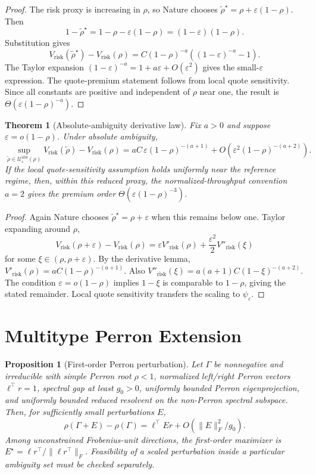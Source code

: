 \documentclass[11pt]{article}
\newtheorem{proposition}[assumption]{Proposition}
\newtheorem{theorem}[assumption]{Theorem}
\newcommand{\eps}{\varepsilon}
\begin{document}
\begin{proof}
The risk proxy is increasing in $\rho$, so Nature chooses
$\tilde\rho^\star=\rho+\eps(1-\rho)$. Then
\[
1-\tilde\rho^\star = 1-\rho-\eps(1-\rho)=(1-\eps)(1-\rho).
\]
Substitution gives
\[
V_{\mathrm{risk}}(\tilde\rho^\star)-V_{\mathrm{risk}}(\rho)
=C(1-\rho)^{-a}\left((1-\eps)^{-a}-1\right).
\]
The Taylor expansion
$(1-\eps)^{-a}=1+a\eps+O(\eps^2)$ gives the small-$\eps$ expression. The
quote-premium statement follows from local quote sensitivity. Since all
constants are positive and independent of $\rho$ near one, the result is
$\Theta(\eps(1-\rho)^{-a})$.
\end{proof}

\begin{theorem}[Absolute-ambiguity derivative law]
Fix $a>0$ and suppose $\eps=o(1-\rho)$. Under absolute ambiguity,
\[
\sup_{\tilde\rho\in\mathcal U^{\mathrm{abs}}_\eps(\rho)}
V_{\mathrm{risk}}(\tilde\rho)-V_{\mathrm{risk}}(\rho)
=aC\,\eps(1-\rho)^{-(a+1)}
+O(\eps^2(1-\rho)^{-(a+2)}).
\]
If the local quote-sensitivity assumption holds uniformly near the reference
regime, then, within this reduced proxy, the normalized-throughput convention
$a=2$ gives the premium order
$\Theta(\eps(1-\rho)^{-3})$.
\end{theorem}

\begin{proof}
Again Nature chooses $\tilde\rho^\star=\rho+\eps$ when this remains below one.
Taylor expanding around $\rho$,
\[
V_{\mathrm{risk}}(\rho+\eps)-V_{\mathrm{risk}}(\rho)
=\eps V'_{\mathrm{risk}}(\rho)
+\frac{\eps^2}{2}V''_{\mathrm{risk}}(\xi)
\]
for some $\xi\in(\rho,\rho+\eps)$. By the derivative lemma,
$V'_{\mathrm{risk}}(\rho)=aC(1-\rho)^{-(a+1)}$. Also
$V''_{\mathrm{risk}}(\xi)=a(a+1)C(1-\xi)^{-(a+2)}$. The condition
$\eps=o(1-\rho)$ implies $1-\xi$ is comparable to $1-\rho$, giving the stated
remainder. Local quote sensitivity transfers the scaling to $\psi_\eps$.
\end{proof}

\section{Multitype Perron Extension}

\begin{proposition}[First-order Perron perturbation]
Let $\Gamma$ be nonnegative and irreducible with simple Perron root
$\rho<1$, normalized left/right Perron vectors $\ell^\top r=1$, spectral
gap at least $g_0>0$, uniformly bounded Perron eigenprojection, and uniformly
bounded reduced resolvent on the non-Perron spectral subspace. Then, for
sufficiently small perturbations $E$,
\[
\rho(\Gamma+E)-\rho(\Gamma)=\ell^\top E r+O(\|E\|_F^2/g_0).
\]
Among unconstrained Frobenius-unit directions, the first-order maximizer is
$E^\star = \ell r^\top/\|\ell r^\top\|_F$. Feasibility of a scaled perturbation
inside a particular ambiguity set must be checked separately.
\end{proposition}
\end{document}
